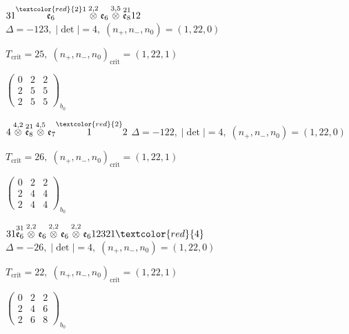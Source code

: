 \documentclass[10pt]{article}
\begin{document}
\smallskip

$31\overset{\textcolor{red}{2}1}{\mathfrak{e}_6}\overset{2,2}{\otimes}\mathfrak{e}_6\overset{3,5}{\otimes}\overset{21}{\mathfrak{e}_8}12$ \quad $\Delta=-123,\; |\det|=4,\; (n_+,n_-,n_0)=(1,22,0)$

\hspace{1em}$T_{\text{crit}}=25,\; (n_+,n_-,n_0)_{\text{crit}}=(1,22,1)$

\hspace{2em}$\left(\begin{smallmatrix}0 & 2 & 2 \\ 2 & 5 & 5 \\ 2 & 5 & 5\end{smallmatrix}\right)_{\!b_0}$

\smallskip

$4\overset{4,2}{\otimes}\overset{21}{\mathfrak{e}_8}\overset{4,5}{\otimes}\mathfrak{e}_7\overset{\textcolor{red}{2}}{1}2$ \quad $\Delta=-122,\; |\det|=4,\; (n_+,n_-,n_0)=(1,22,0)$

\hspace{1em}$T_{\text{crit}}=26,\; (n_+,n_-,n_0)_{\text{crit}}=(1,22,1)$

\hspace{2em}$\left(\begin{smallmatrix}0 & 2 & 2 \\ 2 & 4 & 4 \\ 2 & 4 & 4\end{smallmatrix}\right)_{\!b_0}$

\smallskip

$31\overset{31}{\mathfrak{e}_6}\overset{2,2}{\otimes}\mathfrak{e}_6\overset{2,2}{\otimes}\mathfrak{e}_6\overset{2,2}{\otimes}\mathfrak{e}_612321\textcolor{red}{4}$ \quad $\Delta=-26,\; |\det|=4,\; (n_+,n_-,n_0)=(1,22,0)$

\hspace{1em}$T_{\text{crit}}=22,\; (n_+,n_-,n_0)_{\text{crit}}=(1,22,1)$

\hspace{2em}$\left(\begin{smallmatrix}0 & 2 & 2 \\ 2 & 4 & 6 \\ 2 & 6 & 8\end{smallmatrix}\right)_{\!b_0}$
\end{document}
